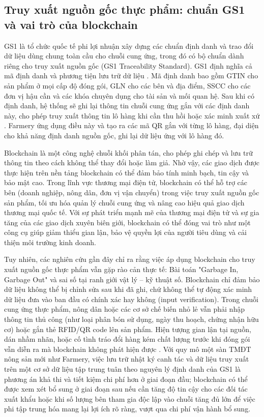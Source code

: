 \subsection{Truy xuất nguồn gốc thực phẩm: chuẩn GS1 và vai trò của blockchain}


GS1 là tổ chức quốc tế phi lợi nhuận xây dựng các chuẩn định danh và trao đổi dữ liệu dùng chung toàn cầu cho chuỗi cung ứng, trong đó có bộ chuẩn dành riêng cho truy xuất nguồn gốc (GS1 Traceability Standard). GS1 định nghĩa cả mã định danh và phương tiện lưu trữ dữ liệu . Mã định danh bao gồm GTIN cho sản phẩm ở mọi cấp độ đóng gói, GLN cho các bên và địa điểm, SSCC cho các đơn vị hậu cần và các khóa chuyên dụng cho tài sản và mối quan hệ. Sau khi có định danh, hệ thống sẽ ghi lại thông tin chuỗi cung ứng gắn với các định danh này, cho phép truy xuất thông tin lô hàng khi cần thu hồi hoặc xác minh xuất xứ \cite{gs1_keys}. Farmery ứng dụng điều này và tạo ra các mã QR gắn với từng lô hàng, đại diện cho khả năng định danh nguồn gốc, ghi lại dữ liệu ứng với lô hàng đó.


Blockchain là một công nghệ chuỗi khối phân tán, cho phép ghi chép và lưu trữ thông tin theo cách không thể thay đổi hoặc làm giả. Nhờ vậy, các giao dịch được thực hiện trên nền tảng blockchain có thể đảm bảo tính minh bạch, tin cậy và bảo mật cao. Trong lĩnh vực thương mại điện tử, blockchain có thể hỗ trợ các bên (doanh nghiệp, nông dân, đơn vị vận chuyển) trong việc truy xuất nguồn gốc sản phẩm, tối ưu hóa quản lý chuỗi cung ứng và nâng cao hiệu quả giao dịch thương mại quốc tế. Với sự phát triển mạnh mẽ của thương mại điện tử và sự gia tăng của các giao dịch xuyên biên giới, blockchain có thể đóng vai trò như một công cụ giúp giảm thiểu gian lận, bảo vệ quyền lợi của người tiêu dùng và cải thiện môi trường kinh doanh.


Tuy nhiên, các nghiên cứu gần đây chỉ ra rằng việc áp dụng blockchain cho truy xuất nguồn gốc thực phẩm vẫn gặp rào cản thực tế: Bài toán "Garbage In, Garbage Out" và sai số tại ranh giới vật lý – kỹ thuật số. Blockchain chỉ đảm bảo dữ liệu không thể bị chỉnh sửa sau khi đã ghi, chứ không thể tự động xác minh dữ liệu đưa vào ban đầu có chính xác hay không (input verification). Trong chuỗi cung ứng thực phẩm, nông dân hoặc các cơ sở chế biến nhỏ lẻ vẫn phải nhập thông tin thủ công (như loại phân bón sử dụng, ngày thu hoạch, chứng nhận hữu cơ) hoặc gắn thẻ RFID/QR code lên sản phẩm. Hiện tượng gian lận tại nguồn, dán nhầm nhãn, hoặc cố tình tráo đổi hàng kém chất lượng trước khi đóng gói vẫn diễn ra mà blockchain không phát hiện được \cite{bath_blockchain}. Với quy mô một sàn TMĐT nông sản mới như Farmery, việc lưu trữ nhật ký canh tác và dữ liệu truy xuất trên một cơ sở dữ liệu tập trung tuân theo nguyên lý định danh của GS1 là phương án khả thi và tiết kiệm chi phí hơn ở giai đoạn đầu; blockchain có thể được xem xét bổ sung ở giai đoạn sau nếu cần tăng độ tin cậy cho các đối tác xuất khẩu hoặc khi số lượng bên tham gia độc lập vào chuỗi tăng đủ lớn để việc phi tập trung hóa mang lại lợi ích rõ ràng, vượt qua chi phí vận hành bổ sung.

